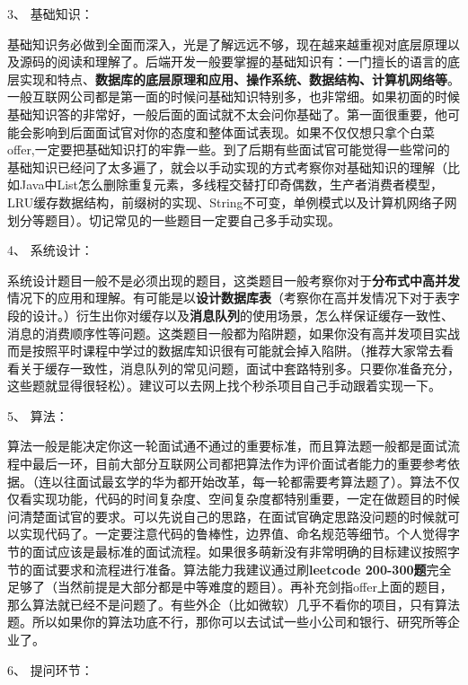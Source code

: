 \documentclass[UTF8]{ctexart}
\begin{document}
3、 基础知识：

基础知识务必做到全面而深入，光是了解远远不够，现在越来越重视对底层原理以及源码的阅读和理解了。后端开发一般要掌握的基础知识有：一门擅长的语言的底层实现和特点、\textbf{数据库的底层原理和应用、操作系统、数据结构、计算机网络等}。一般互联网公司都是第一面的时候问基础知识特别多，也非常细。如果初面的时候基础知识答的非常好，一般后面的面试就不太会问你基础了。第一面很重要，他可能会影响到后面面试官对你的态度和整体面试表现。如果不仅仅想只拿个白菜offer,一定要把基础知识打的牢靠一些。到了后期有些面试官可能觉得一些常问的基础知识已经问了太多遍了，就会以手动实现的方式考察你对基础知识的理解（比如Java中List怎么删除重复元素，多线程交替打印奇偶数，生产者消费者模型，LRU缓存数据结构，前缀树的实现、String不可变，单例模式以及计算机网络子网划分等题目）。切记常见的一些题目一定要自己多手动实现。

4、 系统设计：

系统设计题目一般不是必须出现的题目，这类题目一般考察你对于\textbf{分布式中高并发}情况下的应用和理解。有可能是以\textbf{设计数据库表}（考察你在高并发情况下对于表字段的设计。）衍生出你对缓存以及\textbf{消息队列}的使用场景，怎么样保证缓存一致性、消息的消费顺序性等问题。这类题目一般都为陷阱题，如果你没有高并发项目实战而是按照平时课程中学过的数据库知识很有可能就会掉入陷阱。（推荐大家常去看看关于缓存一致性，消息队列的常见问题，面试中套路特别多。只要你准备充分，这些题就显得很轻松）。建议可以去网上找个秒杀项目自己手动跟着实现一下。

5、 算法：

算法一般是能决定你这一轮面试通不通过的重要标准，而且算法题一般都是面试流程中最后一环，目前大部分互联网公司都把算法作为评价面试者能力的重要参考依据。（连以往面试最玄学的华为都开始改革，每一轮都需要考算法题了）。算法不仅仅看实现功能，代码的时间复杂度、空间复杂度都特别重要，一定在做题目的时候问清楚面试官的要求。可以先说自己的思路，在面试官确定思路没问题的时候就可以实现代码了。一定要注意代码的鲁棒性，边界值、命名规范等细节。个人觉得字节的面试应该是最标准的面试流程。如果很多萌新没有非常明确的目标建议按照字节的面试要求和流程进行准备。算法能力我建议通过刷\textbf{leetcode 200-300题}完全足够了（当然前提是大部分都是中等难度的题目）。再补充剑指offer上面的题目，那么算法就已经不是问题了。有些外企（比如微软）几乎不看你的项目，只有算法题。所以如果你的算法功底不行，那你可以去试试一些小公司和银行、研究所等企业了。

6、 提问环节：
\end{document}
